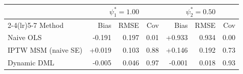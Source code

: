 \begin{tabular}{lrrrrrr}
\toprule
 & \multicolumn{3}{c}{$\psi_1^* = 1.00$} & \multicolumn{3}{c}{$\psi_2^* = 0.50$} \\
\cmidrule(lr){2-4}\cmidrule(lr){5-7}
Method & Bias & RMSE & Cov & Bias & RMSE & Cov \\
\midrule
Naive OLS & -0.191 & 0.197 & 0.01 & +0.933 & 0.934 & 0.00 \\
IPTW MSM (naive SE) & +0.019 & 0.103 & 0.88 & +0.146 & 0.192 & 0.73 \\
Dynamic DML & -0.005 & 0.046 & 0.97 & -0.001 & 0.018 & 0.93 \\
\bottomrule
\end{tabular}

